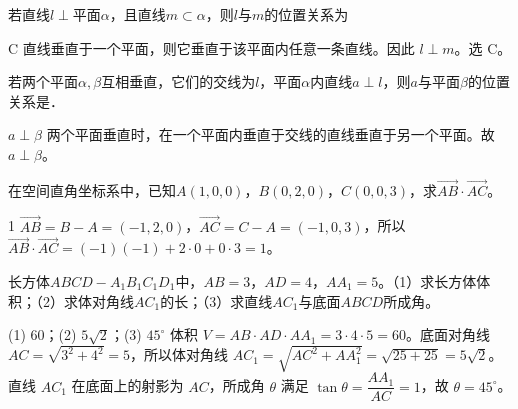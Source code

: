 

\begin{question}[GPT生成]
若直线$l\perp$平面$\alpha$，且直线$m\subset\alpha$，则$l$与$m$的位置关系为\choiceBox
{}
\end{question}
\begin{answer}{C}
直线垂直于一个平面，则它垂直于该平面内任意一条直线。因此 $l\perp m$。选 C。
\end{answer}

\begin{question}[GPT生成]
若两个平面$\alpha,\beta$互相垂直，它们的交线为$l$，平面$\alpha$内直线$a\perp l$，则$a$与平面$\beta$的位置关系是\blank{3cm}．
\end{question}
\begin{answer}{$a\perp\beta$}
两个平面垂直时，在一个平面内垂直于交线的直线垂直于另一个平面。故 $a\perp\beta$。
\end{answer}



\begin{question}[GPT生成]
在空间直角坐标系中，已知$A(1,0,0)$，$B(0,2,0)$，$C(0,0,3)$，求$\overrightarrow{AB}\cdot\overrightarrow{AC}$。
\end{question}
\begin{answer}{1}
$\overrightarrow{AB}=B-A=(-1,2,0)$，$\overrightarrow{AC}=C-A=(-1,0,3)$，所以 $\overrightarrow{AB}\cdot\overrightarrow{AC}=(-1)(-1)+2\cdot0+0\cdot3=1$。
\end{answer}



\begin{question}[GPT生成]
长方体$ABCD-A_1B_1C_1D_1$中，$AB=3$，$AD=4$，$AA_1=5$。（1）求长方体体积；（2）求体对角线$AC_1$的长；（3）求直线$AC_1$与底面$ABCD$所成角。
\end{question}
\solutionSpace{5cm}
\begin{answer}{(1) $60$；(2) $5\sqrt2$；(3) $45^\circ$}
体积 $V=AB\cdot AD\cdot AA_1=3\cdot4\cdot5=60$。底面对角线 $AC=\sqrt{3^2+4^2}=5$，所以体对角线 $AC_1=\sqrt{AC^2+AA_1^2}=\sqrt{25+25}=5\sqrt2$。直线 $AC_1$ 在底面上的射影为 $AC$，所成角 $\theta$ 满足 $\tan\theta=\dfrac{AA_1}{AC}=1$，故 $\theta=45^\circ$。
\end{answer}

